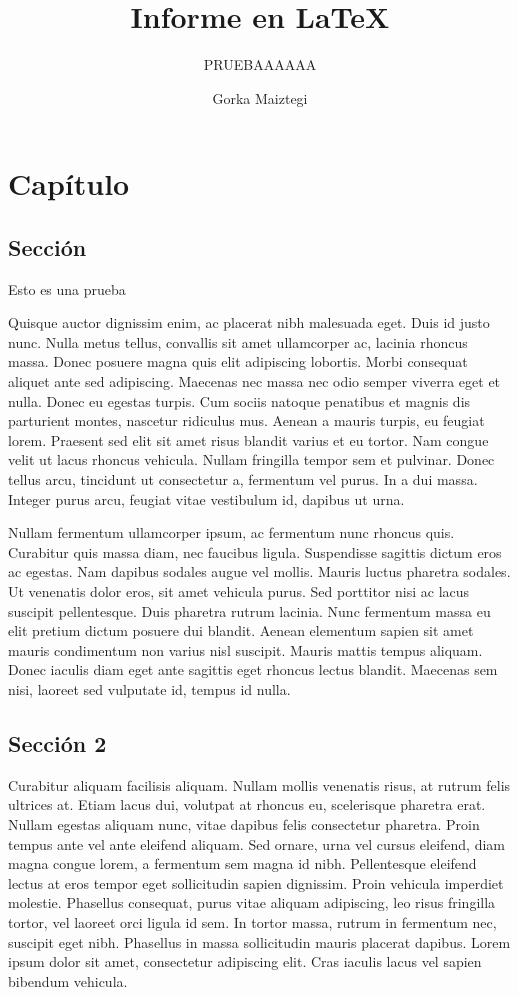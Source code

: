 \documentclass[twoside]{ritsi/report}
\title{Informe en \LaTeX}
\subtitle{PRUEBAAAAAA}
\author{Gorka Maiztegi}
\begin{document}
\chapter{Capítulo}

\section{Sección}

Esto es una prueba

Quisque auctor dignissim enim, ac placerat nibh malesuada eget. Duis id justo nunc. Nulla metus tellus, convallis sit amet ullamcorper ac, lacinia rhoncus massa. Donec posuere magna quis elit adipiscing lobortis. Morbi consequat aliquet ante sed adipiscing. Maecenas nec massa nec odio semper viverra eget et nulla. Donec eu egestas turpis. Cum sociis natoque penatibus et magnis dis parturient montes, nascetur ridiculus mus. Aenean a mauris turpis, eu feugiat lorem. Praesent sed elit sit amet risus blandit varius et eu tortor. Nam congue velit ut lacus rhoncus vehicula. Nullam fringilla tempor sem et pulvinar. Donec tellus arcu, tincidunt ut consectetur a, fermentum vel purus. In a dui massa. Integer purus arcu, feugiat vitae vestibulum id, dapibus ut urna. 

Nullam fermentum ullamcorper ipsum, ac fermentum nunc rhoncus quis. Curabitur quis massa diam, nec faucibus ligula. Suspendisse sagittis dictum eros ac egestas. Nam dapibus sodales augue vel mollis. Mauris luctus pharetra sodales. Ut venenatis dolor eros, sit amet vehicula purus. Sed porttitor nisi ac lacus suscipit pellentesque. Duis pharetra rutrum lacinia. Nunc fermentum massa eu elit pretium dictum posuere dui blandit. Aenean elementum sapien sit amet mauris condimentum non varius nisl suscipit. Mauris mattis tempus aliquam. Donec iaculis diam eget ante sagittis eget rhoncus lectus blandit. Maecenas sem nisi, laoreet sed vulputate id, tempus id nulla. 

\section{Sección 2}

Curabitur aliquam facilisis aliquam. Nullam mollis venenatis risus, at rutrum felis ultrices at. Etiam lacus dui, volutpat at rhoncus eu, scelerisque pharetra erat. Nullam egestas aliquam nunc, vitae dapibus felis consectetur pharetra. Proin tempus ante vel ante eleifend aliquam. Sed ornare, urna vel cursus eleifend, diam magna congue lorem, a fermentum sem magna id nibh. Pellentesque eleifend lectus at eros tempor eget sollicitudin sapien dignissim. Proin vehicula imperdiet molestie. Phasellus consequat, purus vitae aliquam adipiscing, leo risus fringilla tortor, vel laoreet orci ligula id sem. In tortor massa, rutrum in fermentum nec, suscipit eget nibh. Phasellus in massa sollicitudin mauris placerat dapibus. Lorem ipsum dolor sit amet, consectetur adipiscing elit. Cras iaculis lacus vel sapien bibendum vehicula. 
\end{document}
